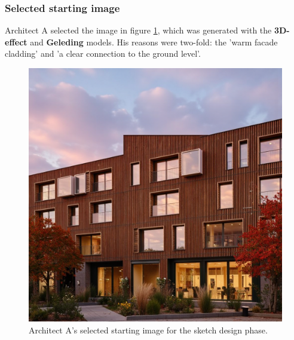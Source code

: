 \subsubsection{Selected starting image}
Architect A selected the image in figure \ref{fig:A-sketch-selected}, which was generated with the \textbf{3D-effect} and \textbf{Geleding} models. His reasons were two-fold: the 'warm facade cladding' and 'a clear connection to the ground level'.
\begin{figure}[H]
    \centering
    \includegraphics[width=0.3\linewidth]{Images/Results/Architect-A_Fixed-images/1-sketch_design/Met_lora_00043_ (1).png}
    \caption{Architect A's selected starting image for the sketch design phase.}
    \label{fig:A-sketch-selected}
\end{figure}

